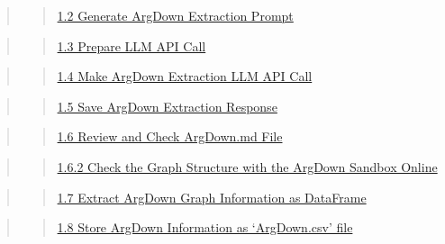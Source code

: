 \documentclass[
  11pt,
  letterpaper,
]{book}
\begin{document}
\begin{quote}
\begin{quote}
\hyperref[scrollTo=6ToQFra3_nl9]{1.2 Generate ArgDown Extraction Prompt}
\end{quote}
\end{quote}

\begin{quote}
\begin{quote}
\hyperref[scrollTo=pGv2KcZU_9Bn]{1.3 Prepare LLM API Call}
\end{quote}
\end{quote}

\begin{quote}
\begin{quote}
\hyperref[scrollTo=i5xsDYnsAWC4]{1.4 Make ArgDown Extraction LLM API
Call}
\end{quote}
\end{quote}

\begin{quote}
\begin{quote}
\hyperref[scrollTo=Lc2nMp8nAfeU]{1.5 Save ArgDown Extraction Response}
\end{quote}
\end{quote}

\begin{quote}
\begin{quote}
\hyperref[scrollTo=5HcCfqE4A0ht]{1.6 Review and Check ArgDown.md File}
\end{quote}
\end{quote}

\begin{quote}
\begin{quote}
\hyperref[scrollTo=gSpkvLbCC_PI]{1.6.2 Check the Graph Structure with
the ArgDown Sandbox Online}
\end{quote}
\end{quote}

\begin{quote}
\begin{quote}
\hyperref[scrollTo=MAm0UKpeBvyr]{1.7 Extract ArgDown Graph Information
as DataFrame}
\end{quote}
\end{quote}

\begin{quote}
\begin{quote}
\hyperref[scrollTo=iFC6oiyICREn]{1.8 Store ArgDown Information as
`ArgDown.csv' file}
\end{quote}
\end{quote}
\end{document}
